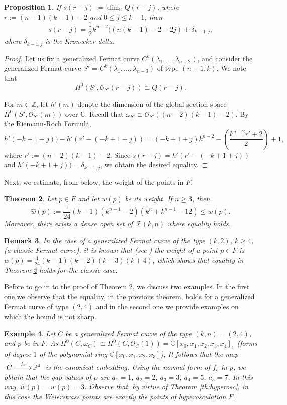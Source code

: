 \documentclass{amsart}
\newcommand{\C}[3]{\ensuremath{C^{#1}(#3_1,...,#3_{#2})}}
\newtheorem{theorem}{Theorem}
\newtheorem{proposition}[theorem]{Proposition}
\newtheorem{example}[theorem]{Example}
\newtheorem{remark}[theorem]{Remark}
\begin{document}
\begin{proposition} \label{pr:dim-s} 
If $s(r-j):= 
 \dim_{{\mathbb{C}}}Q(r-j)$, where  $r:=(n-1)(k-1)-2$ and  $0\leq j\leq k-1$, then
$$s(r-j)=\frac{1}{2} k^{n-2} ((n(k-1) -2 - 2 j)+ \delta_{k-1, j},$$
 where $\delta_{k-1, j}$ is the Kronecker delta.
 \end{proposition}
\begin{proof} Let us fix a generalized Fermat curve $\C{k}{n-2}{\lambda}$, and consider the generalized Fermat curve $S'=\C{k}{n-3}{\lambda}$ of type $(n-1,k)$. We note that 
$$H^{0}(S',\mathcal{O}_{S'}(r-j))\cong Q(r-j).$$

For $m\in{\mathbb{Z}}$,  let $h'(m)$ denote the dimension of the global section space $H^{0}(S',\mathcal{O}_{S'}(m))$ over ${\mathbb{C}}$.
Recall that $\omega_{S'}\cong \mathcal{O}_{S'}((n-2)(k-1)-2)$. By the Riemann-Roch Formula, 
$$h'(-k+1+j))-h'(r'-(-k+1+j))=(-k+1+j)k^{n-2}-\left(\frac{k^{n-2} r' +2}{2}\right)+1,$$
where $r':=(n-2)(k-1)-2$. Since $s(r-j)= h'(r'-(-k+1+j))$ and  $h'(-k+1+j))=\delta_{k-1, j}$, we obtain the desired equality.
\end{proof}

Next, we estimate, from below, the weight of the points in $F$.


\begin{theorem}\label{th:w-peso}
Let $p \in F$ and let $w(p)$ be its weight. If $n\geq 3$, then
$$\widehat{w}(p):=\frac{1}{24}(k-1) (k^{n-1}-2) (k^{n} + k^{n-1}-12)\leq w(p).$$
Moreover, there exists a dense open set  of $\mathcal{F}(k,n)$ where equality holds.  
\end{theorem}


\begin{remark}\label{ej:cla-fer}
In the case of a generalized Fermat curve of the type  $(k,2)$, $k\geq 4$, (a classic Fermat curve), 
it is known that (see \cite{Has50,Roh82,Wat99}) the weight of a point $p\in F$ is
$w(p)=\frac{1}{24}(k-1)(k-2)(k-3)(k+4)$, which shows that equality in Theorem \ref{th:w-peso} holds for the classic case.
\end{remark}
 
Before to go in to the proof of Theorem \ref{th:w-peso}, we discuss two examples. In the first one we observe that the equality, in the previous theorem, holds for a generalized Fermat curve of type $(2,4)$ and in the second one we provide examples on which the bound is not sharp.
 
\begin{example}
\label{ej:(2,4)}
Let  $C$ be a generalized Fermat curve of the type $(k,n)=(2,4)$, and  $p$ be in $F$. As $H^{0}(C,\omega_C)\cong H^{0}(C,\mathcal{O}_C(1))={\mathbb{C}}[x_0,x_1,x_2,x_3,x_4]_1$  (forms of degree $1$ of the polynomial ring  ${\mathbb{C}}[x_0,x_1,x_2,x_3]$),
It follows that the map $\xymatrix{ C \ar[r]^{f_c}&{\mathbb{P}}^{4}}$ is the canonical embedding.
Using the normal form of $f_{c}$ in $p$, we obtain that the gap values of $p$ are
 $a_1=1$, $a_2=2$, $a_3=3$, $a_4=5$, $a_5=7$. In this way,
 $\hat{w}(p)=w(p)=3$. Observe that, by virtue of Theorem \ref{th:hyperosc}, in this case the Weierstrass points are exactly the points of hyperosculation $F$.  
 \end{example}
\end{document}
